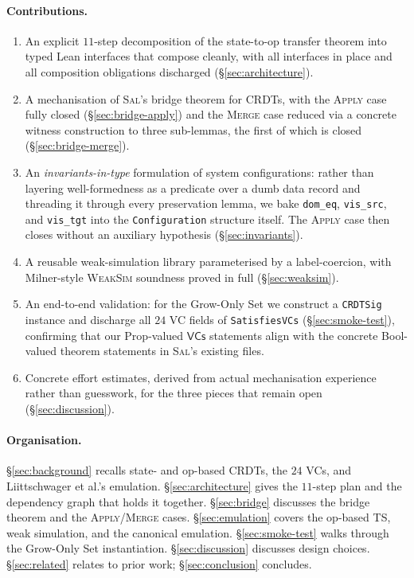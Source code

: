 \documentclass[11pt,a4paper]{article}
\theoremstyle{definition}
\theoremstyle{remark}
\newcommand{\VCs}{\mathsf{VCs}}
\newcommand{\Sal}{\textsc{Sal}}
\begin{document}
\paragraph{Contributions.}
\begin{enumerate}[leftmargin=*]
  \item An explicit $11$-step decomposition of the state-to-op
    transfer theorem into typed Lean interfaces that compose
    cleanly, with all interfaces in place and all composition
    obligations discharged (\S\ref{sec:architecture}).
  \item A mechanisation of \Sal{}'s bridge theorem for CRDTs, with
    the \textsc{Apply} case fully closed (\S\ref{sec:bridge-apply})
    and the \textsc{Merge} case reduced via a concrete witness
    construction to three sub-lemmas, the first of which is closed
    (\S\ref{sec:bridge-merge}).
  \item An \emph{invariants-in-type} formulation of system
    configurations: rather than layering well-formedness as a
    predicate over a dumb data record and threading it through every
    preservation lemma, we bake \texttt{dom\_eq}, \texttt{vis\_src},
    and \texttt{vis\_tgt} into the \texttt{Configuration} structure
    itself. The \textsc{Apply} case then closes without an auxiliary
    hypothesis (\S\ref{sec:invariants}).
  \item A reusable weak-simulation library parameterised by a
    label-coercion, with Milner-style \textsc{WeakSim} soundness
    proved in full (\S\ref{sec:weaksim}).
  \item An end-to-end validation: for the Grow-Only Set we construct
    a \texttt{CRDTSig} instance and discharge all $24$ VC fields of
    \texttt{SatisfiesVCs} (\S\ref{sec:smoke-test}), confirming that
    our Prop-valued $\VCs$ statements align with the concrete
    Bool-valued theorem statements in \Sal{}'s existing files.
  \item Concrete effort estimates, derived from actual mechanisation
    experience rather than guesswork, for the three pieces that
    remain open (\S\ref{sec:discussion}).
\end{enumerate}

\paragraph{Organisation.}
\S\ref{sec:background} recalls state- and op-based CRDTs, the $24$
VCs, and Liittschwager et al.'s emulation.
\S\ref{sec:architecture} gives the $11$-step plan and the
dependency graph that holds it together.
\S\ref{sec:bridge} discusses the bridge theorem and the
\textsc{Apply}/\textsc{Merge} cases.
\S\ref{sec:emulation} covers the op-based TS, weak simulation, and
the canonical emulation.
\S\ref{sec:smoke-test} walks through the Grow-Only Set
instantiation.
\S\ref{sec:discussion} discusses design choices.
\S\ref{sec:related} relates to prior work; \S\ref{sec:conclusion}
concludes.
\end{document}
